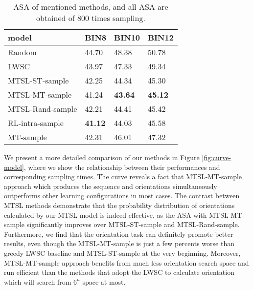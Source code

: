 \begin{table}[!htb]
	\centering
	\begin{tabular}{l|l l l}
		\hline
		model &   BIN8 & BIN10 & BIN12 \\ \hline
		Random &  44.70 & 48.38 & 50.78 \\ 
		LWSC & 43.97 & 47.33 & 49.34 \\ 
		MTSL-ST-sample & 42.25 & 44.34 & 45.30 \\ 
		MTSL-MT-sample & 41.24 & \textbf{43.64} & \textbf{45.12} \\ 
		MTSL-Rand-sample & 42.21 & 44.41 & 45.42 \\ 
		RL-intra-sample & \textbf{41.12} & 44.03 & 45.58 \\ 
		MT-sample & 42.31 & 46.01 & 47.32 \\ \hline
	\end{tabular}
	\caption{ASA of mentioned methods, and all ASA are obtained of 800 times sampling. }
	\label{bin result}
	\vspace{-10pt}
\end{table}

We present a more detailed comparison of our methods in Figure \ref{fig:curve-model}, where we show the relationship between their performances and corresponding sampling times. The curve reveals a fact that MTSL-MT-sample approach which produces the sequence and orientations simultaneously outperforms other learning configurations in most cases. The contrast between MTSL methods demonstrate that the probability distribution of orientations calculated by our MTSL model is indeed effective, as the ASA with MTSL-MT-sample significantly improves over MTSL-ST-sample and MTSL-Rand-sample. Furthermore, we find that the orientation task can definitely promote better results, even though the MTSL-MT-sample is just a few percents worse than greedy LWSC baseline and MTSL-ST-sample at the very beginning. Moreover, MTSL-MT-sample approach benefits from much less orientation search space and run efficient than the methods that adopt the LWSC to calculate orientation which will search from $6^n$ space at most.
%

